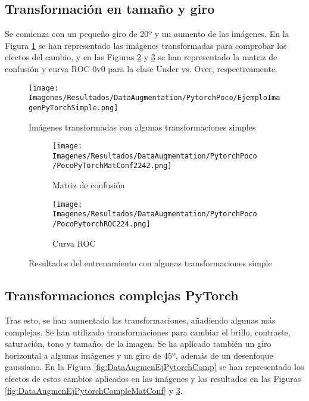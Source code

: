 \documentclass{report}
\begin{document}
\subsection{Transformación en tamaño y giro}


Se comienza con un pequeño giro de 20º y un aumento de las imágenes. En la Figura \ref{fig:DataAugmenEjPytorchSimple} se han representado las imágenes transformadas para comprobar los efectos del cambio, y en las Figuras \ref{fig:DataAugmenEjPytorchSimpleMatConf} y \ref{fig:DataAugmenEjPytorchSimpleROC} se han representado la matriz de confusión y curva ROC 0v0 para la clase Under vs. Over, respectivamente.


\begin{figure}[H]
    \centering
    \texttt{[image: Imagenes/Resultados/DataAugmentation/PytorchPoco/EjemploImagenPyTorchSimple.png]}
    \caption{ Imágenes transformadas con algunas transformaciones simples }
    \label{fig:DataAugmenEjPytorchSimple}
\end{figure}



\vspace{0.4cm}
\begin{figure}[H]
	 	\centering
	 	\begin{subfigure}[b]{0.45\linewidth}
	 	\centering
	 		\texttt{[image: Imagenes/Resultados/DataAugmentation/PytorchPoco/PocoPyTorchMatConf2242.png]}
	 		\caption{ Matriz de confusión }
                    \label{fig:DataAugmenEjPytorchSimpleMatConf}
	 	\end{subfigure}
	 	\begin{subfigure}[b]{0.45\linewidth}
	 	\centering
	 		\texttt{[image: Imagenes/Resultados/DataAugmentation/PytorchPoco/PocoPytorchROC224.png]}
                    \caption{ Curva ROC }
                    \label{fig:DataAugmenEjPytorchSimpleROC}
	 	\end{subfigure}
	 	\caption{ Resultados del entrenamiento con algunas transformaciones simple}
	 	\label{fig:DataAugmentationPytorchSimpleResults}
\end{figure}



\subsection{Transformaciones complejas PyTorch}


Tras esto, se han aumentado las transformaciones, añadiendo algunas más complejas. Se han utilizado transformaciones para cambiar el brillo, contraste, saturación, tono y tamaño, de la imagen. Se ha aplicado también un giro horizontal a algunas imágenes y un giro de 45º, además de un desenfoque gaussiano. En la Figura \ref{fig:DataAugmenEjPytorchComp} se han representado los efectos de estos cambios aplicados en las imágenes y los resultados en las Figuras \ref{fig:DataAugmenEjPytorchCompleMatConf} y \ref{fig:DataAugmenEjPytorchSimpleROC}.
\end{document}
